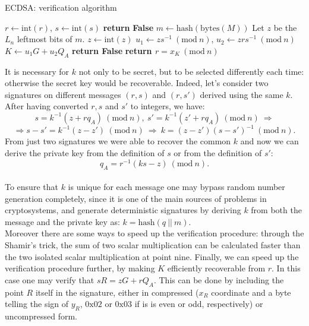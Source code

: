 \bigskip

\begin{algorithm}
	\caption{ECDSA: verification algorithm}
	\label{alg:ecdsa_ver}
	\begin{algorithmic}[1]
		\State $r \gets \text{int}(r)$, $s \gets \text{int}(s)$
		\State \textbf{return} {\bf False}
		\EndIf
		\State $m \gets \text{hash}(\text{bytes}(M))$
		\State Let $z$ be the $L_n$ leftmost bits of $m$. $z \gets \text{int}(z)$
		\State $u_1 \gets zs^{-1} \ (\text{mod} \ n)$, $u_2 \gets zrs^{-1} \ (\text{mod} \ n)$
		\State $K \gets u_1G + u_2Q_A$
		\State \textbf{return False} 
		\EndIf
		\State \textbf{return $r = x_K \ (\text{mod} \ n)$}
		\EndProcedure	
	\end{algorithmic}
\end{algorithm}

\bigskip
\noindent
It is necessary for $k$ not only to be secret, but to be selected differently each time: otherwise the secret key would be recoverable. Indeed, let's consider two signatures on different messages $(r, s)$ and $(r, s')$ derived using the same $k$. After having converted $r, s$ and $s'$ to integers, we have:
$$s = k^{-1}(z + rq_A) \ (\text{mod} \ n), \ s' = k^{-1}(z' + rq_A) \ (\text{mod} \ n) \ \Longrightarrow $$ $$\Longrightarrow s - s' = k^{-1}(z - z') \ (\text{mod} \ n) \ \Longrightarrow \ k = (z - z')(s - s')^{-1} \ (\text{mod} \ n).$$
From just two signatures we were able to recover the common $k$ and now we can derive the private key from the definition of $s$ or from the definition of $s'$:
$$q_A = r^{-1}(ks - z) \ (\text{mod} \ n).$$
\\
To ensure that $k$ is unique for each message one may bypass random number generation completely, since it is one of the main sources of problems in cryptosystems, and generate deterministic signatures by deriving $k$ from both the message and the private key as: $k = \text{hash}(q \ || \ m)$.
\\
Moreover there are some ways to speed up the verification procedure: through the Shamir’s trick, the sum of two scalar multiplication can be calculated faster than the two isolated scalar multiplication at point nine. Finally, we can speed up the verification procedure further, by making $K$ efficiently recoverable from $r$. In this case one may verify that $sR = zG + rQ_A$. This can be done by including the point $R$ itself in the signature, either in compressed ($x_R$ coordinate and a byte telling the sign of $y_R$, $0\text{x}02$ or $0\text{x}03$ if is is even or odd, respectively) or uncompressed form.

